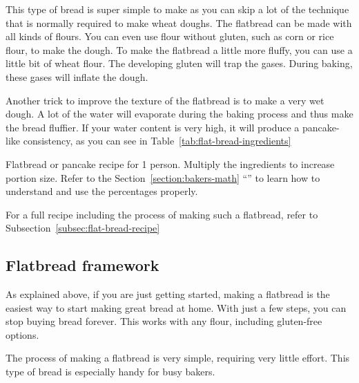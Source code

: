 This type of bread is super simple to make as you can skip
a lot of the technique that is normally required to make wheat doughs.
The flatbread can be made with all kinds of flours. You can even use
flour without gluten, such as corn or rice flour, to make the
dough. To make the flatbread a little more fluffy, you
can use a little bit of wheat flour. The developing gluten
will trap the gases. During baking, these gases will
inflate the dough.

Another trick to improve the texture of the flatbread is to
make a very wet dough. A lot of the water will evaporate
during the baking process and thus make the bread fluffier.
If your water content is very high, it will produce a
pancake-like consistency, as you can see in
Table~\ref{tab:flat-bread-ingredients}

\begin{table}[!htb]
    \begin{center}
        
        \caption[Flatbread recipe]{Flatbread or pancake recipe for 1 person.
            Multiply the ingredients to increase portion size.  Refer to the
            Section~\ref{section:bakers-math}
            ``'' to learn how to understand and
            use the percentages properly.}%
            \label{tab:flat-bread-ingredients}
    \end{center}
\end{table}

For a full recipe including the process of making such a flatbread,   refer to
Subsection~\ref{subsec:flat-bread-recipe}

\subsection{Flatbread framework}%
\label{subsec:flat-bread-framework}

As explained above, if you are just getting started, making a flatbread is the
easiest way to start making great bread at home. With just a
few steps, you can stop buying bread forever. This works with
any flour, including gluten-free options.

\begin{flowchart}[!htb]
\begin{center}
  
  \caption[The process to make a sourdough flatbread]{The process of making a flatbread is very
      simple, requiring very little effort. This type of bread is especially
      handy for busy bakers.}%
  \label{fig:flat-bread-process}
\end{center}
\end{flowchart}

